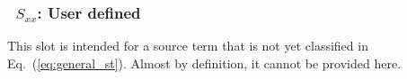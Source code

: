 \vsssub
\subsubsection{~$S_{xx}$: User defined} \label{sec:XXx}
\vsssub


\noindent 
This slot is intended for a source term that is not yet classified in
Eq.~(\ref{eq:general_st}). Almost by definition, it cannot be provided here.